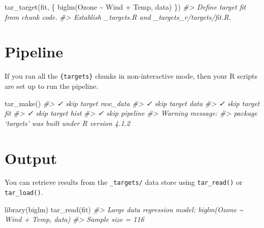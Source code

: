 \documentclass[
]{book}
\newenvironment{Shaded}{\begin{snugshade}}{\end{snugshade}}
\newcommand{\CommentTok}[1]{\textcolor[rgb]{0.56,0.35,0.01}{\textit{#1}}}
\newcommand{\FunctionTok}[1]{\textcolor[rgb]{0.00,0.00,0.00}{#1}}
\newcommand{\NormalTok}[1]{#1}
\newcommand{\SpecialCharTok}[1]{\textcolor[rgb]{0.00,0.00,0.00}{#1}}
\begin{document}
\begin{Shaded}
\begin{Highlighting}[]
\FunctionTok{tar\_target}\NormalTok{(fit, \{}
  \FunctionTok{biglm}\NormalTok{(Ozone }\SpecialCharTok{\textasciitilde{}}\NormalTok{ Wind }\SpecialCharTok{+}\NormalTok{ Temp, data)}
\NormalTok{\})}
\CommentTok{\#\textgreater{} Define target fit from chunk code.}
\CommentTok{\#\textgreater{} Establish \_targets.R and \_targets\_r/targets/fit.R.}
\end{Highlighting}
\end{Shaded}

\hypertarget{pipeline}{%
\section{Pipeline}\label{pipeline}}

If you ran all the \texttt{\{targets\}} chunks in non-interactive mode, then your R scripts are set up to run the pipeline.

\begin{Shaded}
\begin{Highlighting}[]
\FunctionTok{tar\_make}\NormalTok{()}
\CommentTok{\#\textgreater{} ✓ skip target raw\_data}
\CommentTok{\#\textgreater{} ✓ skip target data}
\CommentTok{\#\textgreater{} ✓ skip target fit}
\CommentTok{\#\textgreater{} ✓ skip target hist}
\CommentTok{\#\textgreater{} ✓ skip pipeline}
\CommentTok{\#\textgreater{} Warning message:}
\CommentTok{\#\textgreater{} package ‘targets’ was built under R version 4.1.2}
\end{Highlighting}
\end{Shaded}

\hypertarget{output}{%
\section{Output}\label{output}}

You can retrieve results from the \texttt{\_targets/} data store using \texttt{tar\_read()} or \texttt{tar\_load()}.

\begin{Shaded}
\begin{Highlighting}[]
\FunctionTok{library}\NormalTok{(biglm)}
\FunctionTok{tar\_read}\NormalTok{(fit)}
\CommentTok{\#\textgreater{} Large data regression model: biglm(Ozone \textasciitilde{} Wind + Temp, data)}
\CommentTok{\#\textgreater{} Sample size =  116}
\end{Highlighting}
\end{Shaded}
\end{document}
